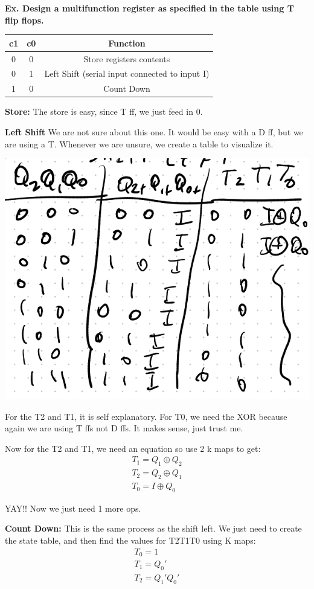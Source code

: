\documentclass[12pt,letterpaper]{article} \usepackage{amsmath} \usepackage{graphicx} \usepackage[margin=1in]{geometry} \usepackage{longtable}  \usepackage{amssymb}
\begin{document}
		\begin{mdframed}[]
		\textbf{Ex. Design a multifunction register as specified in the table using T flip flops.}
		\begin{center}
		\begin{tabular}{|c|c|c|}
			\hline
			\textbf{c1} & \textbf{c0} & \textbf{Function} \\
			\hline
			0 & 0 & Store registers contents \\
			\hline
			0 & 1 & Left Shift (serial input connected to input I) \\
			\hline
			1 & 0 & Count Down \\
			\hline
		\end{tabular} 
		\end{center}
	
		\textbf{Store: } The store is easy, since T ff, we just feed in 0.
		
		\textbf{Left Shift} We are not sure about this one. It would be easy with a D ff, but we are using a T. Whenever we are unsure, we create a table to visualize it. 
		
		\begin{center}
		\includegraphics[width=0.5\linewidth]{ex1}
		\end{center}
	
		For the T2 and T1, it is self explanatory. For T0, we need the XOR because again we are using T ffs not D ffs. It makes sense, just trust me. 
		
		Now for the T2 and T1, we need an equation so use 2 k maps to get:
		\begin{align*}
			T_1 = Q_1 \oplus Q_2 \\
			T_2 = Q_2 \oplus Q_1 \\
			T_0 = I\oplus Q_0
		\end{align*}
	
		YAY!! Now we just need 1 more ops. 
		
		\textbf{Count Down: } This is the same process as the shift left. We just need to create the state table, and then find the values for T2T1T0 using K maps: 
		\begin{align*}
			T_0 = 1\\
			T_1 = Q_0 '\\
			T_2 = Q_1 ' Q_0 '
		\end{align*}
	

\end{mdframed}
\end{document}
